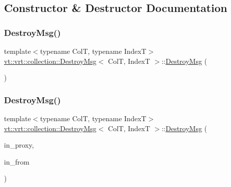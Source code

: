 \subsection{Constructor \& Destructor Documentation}
\mbox{\label{structvt_1_1vrt_1_1collection_1_1_destroy_msg_a3c7d44bb51d25e0853cb56c4403c2666}} 
\subsubsection{\texorpdfstring{Destroy\+Msg()}{DestroyMsg()}\hspace{0.1cm}{\footnotesize\ttfamily [1/2]}}
{\footnotesize\ttfamily template$<$typename ColT, typename IndexT$>$ \\
\hyperlink{structvt_1_1vrt_1_1collection_1_1_destroy_msg}{vt\+::vrt\+::collection\+::\+Destroy\+Msg}$<$ ColT, IndexT $>$\+::\hyperlink{structvt_1_1vrt_1_1collection_1_1_destroy_msg}{Destroy\+Msg} (\begin{DoxyParamCaption}{ }\end{DoxyParamCaption})\hspace{0.3cm}{\ttfamily [default]}}

\mbox{\label{structvt_1_1vrt_1_1collection_1_1_destroy_msg_a7a4d9c50086362cd44933fc4c2b6f53d}} 
\subsubsection{\texorpdfstring{Destroy\+Msg()}{DestroyMsg()}\hspace{0.1cm}{\footnotesize\ttfamily [2/2]}}
{\footnotesize\ttfamily template$<$typename ColT, typename IndexT$>$ \\
\hyperlink{structvt_1_1vrt_1_1collection_1_1_destroy_msg}{vt\+::vrt\+::collection\+::\+Destroy\+Msg}$<$ ColT, IndexT $>$\+::\hyperlink{structvt_1_1vrt_1_1collection_1_1_destroy_msg}{Destroy\+Msg} (\begin{DoxyParamCaption}\item[{\hyperlink{structvt_1_1vrt_1_1collection_1_1_destroy_msg_a5bf089cacadf94e55e9ae797c4cd0462}{Collection\+Proxy\+Type} const \&}]{in\+\_\+proxy,  }\item[{\hyperlink{namespacevt_a866da9d0efc19c0a1ce79e9e492f47e2}{Node\+Type} const \&}]{in\+\_\+from }\end{DoxyParamCaption})\hspace{0.3cm}{\ttfamily [inline]}}



